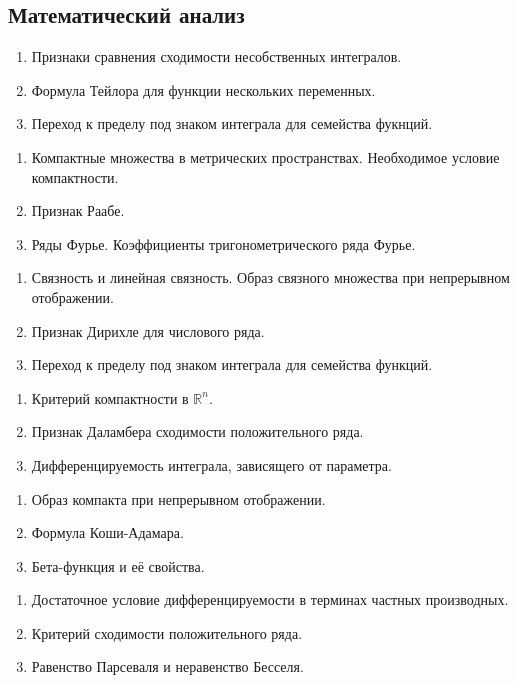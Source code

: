 \documentclass{article}
\newcounter{ticket}[subsection]
\newenvironment{ticket}[1][]{\item[Билет \ifthenelse{\equal{#1}{}}{}{\setcounter{ticket}{#1}}\theticket\refstepcounter{ticket}:]\phantom{}\begin{enumerate}}{\end{enumerate}}
\begin{document}
\subsection*{Математический анализ}
\begin{description}
	\begin{ticket}[1]
		\item Признаки сравнения сходимости несобственных интегралов.
		\item Формула Тейлора для функции нескольких переменных.
		\item Переход к пределу под знаком интеграла для
		      семейства фукнций.
	\end{ticket}
	\begin{ticket}[4]
		\item Компактные множества в метрических пространствах.
		      Необходимое условие компактности.
		\item Признак Раабе.
		\item Ряды Фурье. Коэффициенты тригонометрического ряда Фурье.
	\end{ticket}
	\begin{ticket}
		\item Связность и линейная связность. Образ связного множества
		      при непрерывном отображении.
		\item Признак Дирихле для числового ряда.
		\item Переход к пределу под знаком интеграла для
		      семейства функций.
	\end{ticket}
	\begin{ticket}
		\item Критерий компактности в $\mathbb{R}^n$.
		\item Признак Даламбера сходимости положительного ряда.
		\item Дифференцируемость интеграла, зависящего от параметра.
	\end{ticket}
	\begin{ticket}
		\item Образ компакта при непрерывном отображении.
		\item Формула Коши-Адамара.
		\item Бета-функция и её свойства.
	\end{ticket}
	\begin{ticket}
		\item Достаточное условие дифференцируемости в терминах
		      частных производных.
		\item Критерий сходимости положительного ряда.
		\item Равенство Парсеваля и неравенство Бесселя.

\end{ticket}
\end{description}
\end{document}
